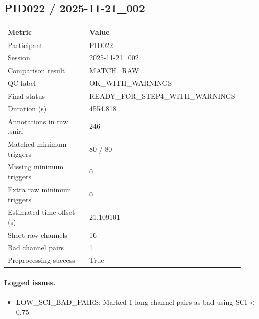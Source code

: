 \subsection*{PID022 / 2025-11-21\_002}
\begin{tabular}{p{0.34\linewidth}p{0.58\linewidth}}
\toprule
Metric & Value\\
\midrule
Participant & PID022\\
Session & 2025-11-21\_002\\
Comparison result & MATCH\_RAW\\
QC label & OK\_WITH\_WARNINGS\\
Final status & READY\_FOR\_STEP4\_WITH\_WARNINGS\\
Duration (s) & 4554.818\\
Annotations in raw .snirf & 246\\
Matched minimum triggers & 80 / 80\\
Missing minimum triggers & 0\\
Extra raw minimum triggers & 0\\
Estimated time offset (s) & 21.109101\\
Short raw channels & 16\\
Bad channel pairs & 1\\
Preprocessing success & True\\
\bottomrule
\end{tabular}
\paragraph{Logged issues.}
\begin{itemize}
\item [WARNING] LOW\_SCI\_BAD\_PAIRS: Marked 1 long-channel pairs as bad using SCI < 0.75
\end{itemize}
